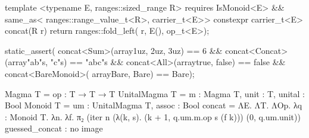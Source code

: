 \begin{listing}[tp]
\vspace{-7pt}
\begin{minipage}[t]{0.48\linewidth}
\begin{cpp}
template <typename E,
          ranges::sized_range R>
  requires IsMonoid<E> && same_as<
      ranges::range_value_t<R>,
      carrier_t<E>>
constexpr carrier_t<E> concat(R r) {
  return ranges::fold_left(
      r, E{}(), op_t<E>{}); }
\end{cpp}
\end{minipage}\hspace{0.04\linewidth}%
\begin{minipage}[t]{0.48\linewidth}
\begin{cpp}
static_assert(
concat<Sum>(array{1uz, 2uz, 3uz}) == 6 &&
concat<Concat>(array{"ab"s, "c"s})
    == "abc"s &&
concat<All>(array{true, false})
    == false &&
concat<BareMonoid>(
    array{Bare{}, Bare{}}) == Bare{});
\end{cpp}
\end{minipage}
\vspace{-7pt}
\begin{sysf}
Magma T        = { op : T → T → T }
UnitalMagma T  = { m : Magma T, unit : T, unital : Bool }
Monoid T       = { um : UnitalMagma T, assoc : Bool }
concat = ΛE. ΛT. ΛOp. λq : Monoid T. λn. λf.
  π₂ (iter n (λ(k, s). (k + 1, q.um.m.op s (f k))) (0, q.um.unit))
guessed_concat : no image
\end{sysf}
\caption{What a signature prevents. Left: a monoid as a shape; the two functions. Right: two monoids, the second the smallest; tests. Below: the images.}
\label{lst:motivation}
\end{listing}

